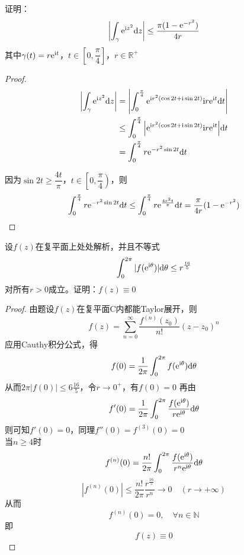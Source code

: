 \begin{proposition}

    证明：
    $$\left| \int_{\gamma}{\mathrm{e}^{\mathrm{i} z^2}}\mathrm{d} z \right| \leq \dfrac{\pi(1 - \mathrm{e}^{-r^2})}{4r}$$
    其中$\gamma(t) = r\mathrm{e}^{\mathrm{i} t}$，$t \in \left[ 0, \dfrac{\pi}{4} \right]$，$r \in \mathbb{R}^+$

\end{proposition}

\begin{proof}

    \begin{align*}
        \left| \int_{\gamma}{\mathrm{e}^{\mathrm{i} z^2}}\mathrm{d} z \right| & = \left| \int_{0}^{\frac{\pi}{4}}{\mathrm{e}^{\mathrm{i} r^2(\cos{2t} + \mathrm{i}\sin{2t})}\mathrm{i} r\mathrm{e}^{\mathrm{i} t}}\mathrm{d} t \right| \\
        & \leq \int_{0}^{\frac{\pi}{4}}{\left| \mathrm{e}^{\mathrm{i} r^2(\cos{2t} + \mathrm{i}\sin{2t})}\mathrm{i} r\mathrm{e}^{\mathrm{i} t} \right|}\mathrm{d} t \\
        & = \int_{0}^{\frac{\pi}{4}}{r\mathrm{e}^{-r^2\sin{2t}}}\mathrm{d} t
    \end{align*}

    因为$\sin{2t} \geq \dfrac{4t}{\pi}$，$t \in \left[ 0, \dfrac{\pi}{4} \right)$，则
    $$\int_{0}^{\frac{\pi}{4}}{r\mathrm{e}^{-r^2\sin{2t}}}\mathrm{d} t \leq \int_{0}^{\frac{\pi}{4}}{r\mathrm{e}^{\frac{4r^2t}{\pi}}}\mathrm{d} t = \dfrac{\pi}{4r}(1 - \mathrm{e}^{-r^2}) $$

\end{proof}

\begin{proposition}

    设$f(z)$在复平面上处处解析，并且不等式
    $$\int_{0}^{2\pi}{|f(\mathrm{e^{\mathrm{i} \theta}})|}\mathrm{d} \theta \leq r^{\frac{16}{5}} $$
    对所有$r > 0$成立。证明：$f(z) \equiv 0$

\end{proposition}

\begin{proof}

    由题设$f(z)$在复平面$\mathrm{C}$内都能\textup{Taylor}展开，则
    $$f(z) = \sum\limits_{n = 0}^{\infty}{\dfrac{f^{(n)}(z_0)}{n!}(z - z_0)^n}$$
    应用\textup{Cauthy}积分公式，得
    $$f(0) = \dfrac{1}{2\pi} \int_{0}^{2\pi}{f(\mathrm{e}^{\mathrm{i} \theta})}\mathrm{d} \theta$$
    从而$2\pi|f(0)| \leq 6{\frac{16}{5}}$，令$r \to 0^{+}$，有$f(0) = 0$
    再由
    $$f'(0) = \dfrac{1}{2\pi} \int_{0}^{2\pi}{\dfrac{f(\mathrm{e}^{\mathrm{i} \theta})}{r\mathrm{e}^{\mathrm{i} \theta}}}\mathrm{d} \theta$$
    则可知$f'(0) = 0$，同理$f''(0) = f^{(3)}(0) = 0$ \\
    当$n \geq 4$时
    $$f^{(n)}(0) =  \dfrac{n!}{2\pi} \int_{0}^{2\pi}{\dfrac{f(\mathrm{e}^{\mathrm{i}\theta})}{r^n \mathrm{e}^{\mathrm{i}\theta}}}\mathrm{d} \theta$$
    $$|f^{(n)}(0)| \leq \dfrac{n!}{2\pi} \dfrac{r^{\frac{16}{5}}}{r^n} \to 0 \quad (r \to + \infty)$$
    从而
    $$f^{(n)}(0) = 0, \quad \forall n \in \mathbb{N}$$
    即
    $$f(z) \equiv 0$$
    
\end{proof}

